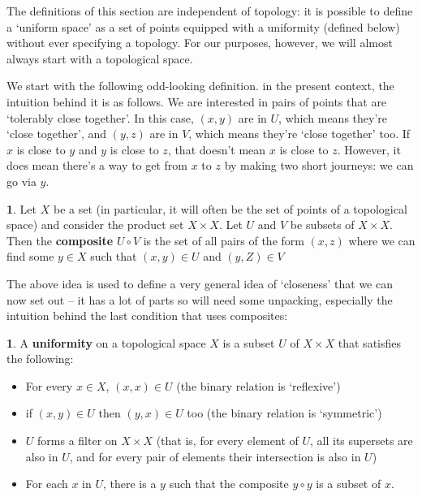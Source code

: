 \documentclass[oneside,english]{amsbook}
\numberwithin{section}{chapter}
\theoremstyle{plain}
\theoremstyle{definition}
\newtheorem{defn}[thm]{\protect\definitionname}
\providecommand{\definitionname}{Definition}
\begin{document}
The definitions of this section are independent of topology: it is possible to define a `uniform space' as a set of points equipped with a uniformity (defined below) without ever specifying a topology. For our purposes, however, we will almost always start with a topological space.

We start with the following odd-looking definition. in the present context, the intuition behind it is as follows. We are interested in pairs of points that are `tolerably close together'. In this case, $(x, y)$ are in $U$, which means they're `close together', and $(y, z)$ are in $V$, which means they're `close together' too. If $x$ is close to $y$ and $y$ is close to $z$, that doesn't mean $x$ is close to $z$. However, it does mean there's a way to get from $x$ to $z$ by making two short journeys: we can go via $y$.

\begin{defn}
	Let $X$ be a set (in particular, it will often be the set of points of a topological space) and consider the product set $X\times X$. Let $U$ and $V$ be subsets of $X\times X$. Then the \textbf{composite} $U\circ V$ is the set of all pairs of the form $(x, z)$ where we can find some $y\in X$ such that $(x, y)\in U$ and $(y, Z)\in V$
\end{defn}

The above idea is used to define a very general idea of `closeness' that we can now set out -- it has a lot of parts so will need some unpacking, especially the intuition behind the last condition that uses composites:

\begin{defn} 
	A \textbf{uniformity} on a topological space $X$ is a subset $U$ of $X\times X$ that satisfies the following:
	\begin{itemize}
		\item For every $x\in X$, $(x, x)\in U$ (the binary relation is `reflexive')
		\item if $(x, y)\in U$ then $(y, x)\in U$ too (the binary relation is `symmetric')
		\item $U$ forms a filter on $X\times X$ (that is, for every element of $U$, all its supersets are also in $U$, and for every pair of elements their intersection is also in $U$)
		\item For each $x$ in $U$, there is a $y$ such that the composite $y\circ y$ is a subset of $x$.
	\end{itemize}
\end{defn} 
\end{document}

